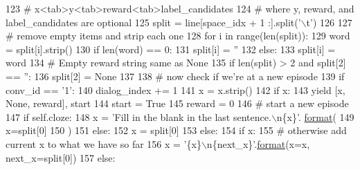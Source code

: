 \begin{DoxyCode}
123                 \textcolor{comment}{# x<tab>y<tab>reward<tab>label\_candidates}
124                 \textcolor{comment}{# where y, reward, and label\_candidates are optional}
125                 split = line[space\_idx + 1 :].split(\textcolor{stringliteral}{'\(\backslash\)t'})
126 
127                 \textcolor{comment}{# remove empty items and strip each one}
128                 \textcolor{keywordflow}{for} i \textcolor{keywordflow}{in} range(len(split)):
129                     word = split[i].strip()
130                     \textcolor{keywordflow}{if} len(word) == 0:
131                         split[i] = \textcolor{stringliteral}{''}
132                     \textcolor{keywordflow}{else}:
133                         split[i] = word
134                 \textcolor{comment}{# Empty reward string same as None}
135                 \textcolor{keywordflow}{if} len(split) > 2 \textcolor{keywordflow}{and} split[2] == \textcolor{stringliteral}{''}:
136                     split[2] = \textcolor{keywordtype}{None}
137 
138                 \textcolor{comment}{# now check if we're at a new episode}
139                 \textcolor{keywordflow}{if} conv\_id == \textcolor{stringliteral}{'1'}:
140                     dialog\_index += 1
141                     x = x.strip()
142                     \textcolor{keywordflow}{if} x:
143                         \textcolor{keywordflow}{yield} [x, \textcolor{keywordtype}{None}, reward], start
144                     start = \textcolor{keyword}{True}
145                     reward = 0
146                     \textcolor{comment}{# start a new episode}
147                     \textcolor{keywordflow}{if} self.cloze:
148                         x = \textcolor{stringliteral}{'Fill in the blank in the last sentence.\(\backslash\)n\{x\}'}.
      \hyperlink{namespaceparlai_1_1chat__service_1_1services_1_1messenger_1_1shared__utils_a32e2e2022b824fbaf80c747160b52a76}{format}(
149                             x=split[0]
150                         )
151                     \textcolor{keywordflow}{else}:
152                         x = split[0]
153                 \textcolor{keywordflow}{else}:
154                     \textcolor{keywordflow}{if} x:
155                         \textcolor{comment}{# otherwise add current x to what we have so far}
156                         x = \textcolor{stringliteral}{'\{x\}\(\backslash\)n\{next\_x\}'}.\hyperlink{namespaceparlai_1_1chat__service_1_1services_1_1messenger_1_1shared__utils_a32e2e2022b824fbaf80c747160b52a76}{format}(x=x, next\_x=split[0])
157                     \textcolor{keywordflow}{else}:

\end{DoxyCode}
